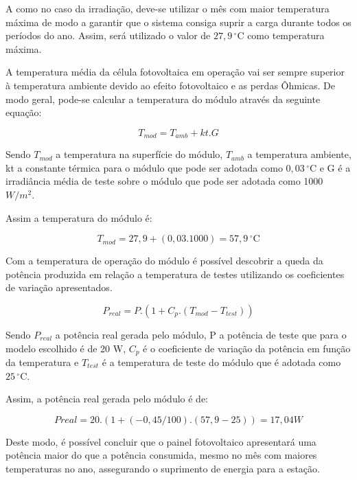 A como no caso da irradiação, deve-se utilizar o mês com maior temperatura máxima de modo a garantir que o sistema consiga suprir a carga durante todos os períodos do ano. Assim, será utilizado o valor de $27,9\,^{\circ}\mathrm{C}$ como temperatura máxima.

A temperatura média da célula fotovoltaica em operação vai ser sempre superior à temperatura ambiente devido ao efeito fotovoltaico e as perdas Ôhmicas. De modo geral, pode-se calcular a temperatura do módulo através da seguinte equação:

\begin{equation}
T_{mod} = T_{amb} + kt . G
\end{equation}

	Sendo $T_{mod}$ a temperatura na superfície do módulo, $T_{amb}$ a temperatura ambiente, kt a constante térmica para o módulo que pode ser adotada como $0,03\,^{\circ}\mathrm{C}$ e G é a irradiância média de teste sobre o módulo que pode ser adotada como 1000 $W/m^2$. 
	
	Assim a temperatura do módulo é:

\begin{equation}
T_{mod} = 27,9 + (0,03 . 1000) = 57,9 \,^{\circ}\mathrm{C}
\end{equation}

Com a temperatura de operação do módulo é possível descobrir a queda da potência produzida em relação a temperatura de testes utilizando os coeficientes de variação apresentados.

\begin{equation}
P_{real} =P . (1 + C_p . (T_{mod} - T_{test}))
\end{equation}


	Sendo $P_{real}$ a potência real gerada pelo módulo, P a potência de teste que para o modelo escolhido é de 20 W, $C_p$  é o coeficiente de variação da potência em função da temperatura e $T_{test}$ é a temperatura de teste do módulo que é adotada como $25\,^{\circ}\mathrm{C}$.
	
	Assim, a potência real gerada pelo módulo é de:

\begin{equation}
Preal= 20 . (1 + (- 0,45/100) . (57,9 - 25)) = 17,04 W
\end{equation}

Deste modo, é possível concluir que o painel fotovoltaico apresentará uma potência maior do que a potência consumida, mesmo no mês com maiores temperaturas no ano, assegurando o suprimento de energia para a estação. 


